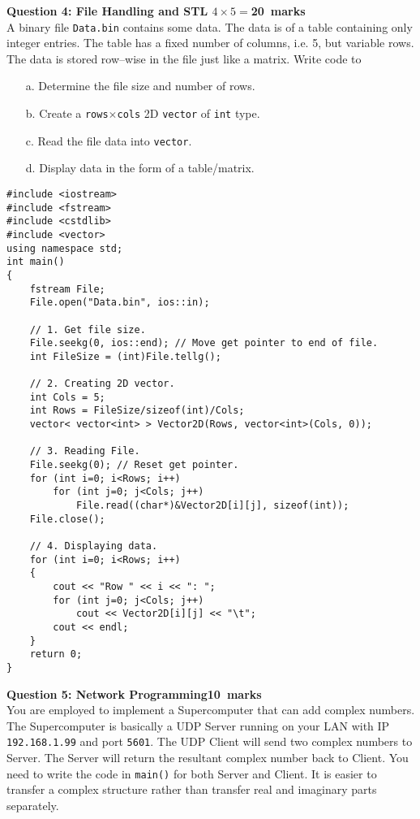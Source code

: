 \documentclass[12pt,a4paper]{article}
\def\Qfour{20}
\def\Qfive{10}
\begin{document}
\newpage
\noindent\textbf{Question 4: File Handling and STL \hfill $4\times 5=$\Qfour~marks}\\
A binary file \verb|Data.bin| contains some data. The data is of a table containing only integer entries. The table has a fixed number of columns, i.e. 5, but variable rows. The data is stored row--wise in the file just like a matrix. Write code to
\begin{itemize}
\item[a.] Determine the file size and number of rows.
\item[b.] Create a \verb|rows|$\times$\verb|cols| 2D \verb|vector| of \verb|int| type.
\item[c.] Read the file data into \verb|vector|.
\item[d.] Display data in the form of a table/matrix.
\end{itemize}
\begin{lstlisting}
#include <iostream>
#include <fstream>
#include <cstdlib>
#include <vector>
using namespace std;
int main()
{
	fstream File;
	File.open("Data.bin", ios::in);

	// 1. Get file size.
	File.seekg(0, ios::end); // Move get pointer to end of file.
	int FileSize = (int)File.tellg();

	// 2. Creating 2D vector.
	int Cols = 5;
	int Rows = FileSize/sizeof(int)/Cols;
	vector< vector<int> > Vector2D(Rows, vector<int>(Cols, 0));

	// 3. Reading File.
	File.seekg(0); // Reset get pointer.
	for (int i=0; i<Rows; i++)
		for (int j=0; j<Cols; j++)
			File.read((char*)&Vector2D[i][j], sizeof(int));
	File.close();

	// 4. Displaying data.
	for (int i=0; i<Rows; i++)
	{
		cout << "Row " << i << ": ";
		for (int j=0; j<Cols; j++)
			cout << Vector2D[i][j] << "\t";
		cout << endl;
	}
	return 0;
}
\end{lstlisting}
\newpage
\noindent\textbf{Question 5: Network Programming\hfill \Qfive~marks}\\
You are employed to implement a Supercomputer that can add complex numbers. The Supercomputer is basically a UDP Server running on your LAN with IP \verb|192.168.1.99| and port \verb|5601|. The UDP Client will send two complex numbers to Server. The Server will return the resultant complex number back to Client. You need to write the code in \verb|main()| for both Server and Client. It is easier to transfer a complex structure rather than transfer real and imaginary parts separately.\\
\end{document}
